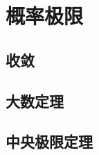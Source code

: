 \documentclass[../main]{subfiles}
\begin{document}
\chapter{概率极限}

\section{收敛}

\section{大数定理}

\section{中央极限定理}
\end{document}
